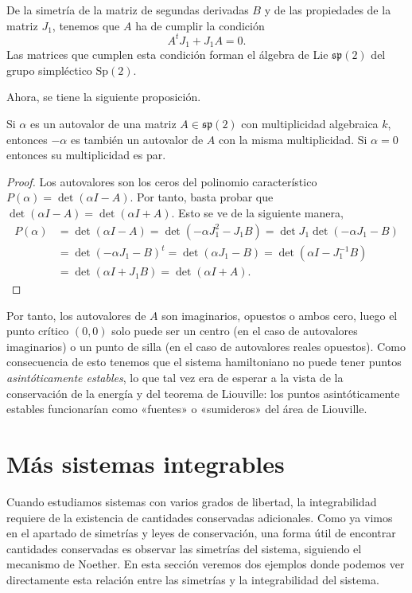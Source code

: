    De la simetría de la matriz de segundas derivadas $B$ y de las propiedades de la matriz $J_1$, tenemos que $A$ ha de cumplir la condición
   \begin{equation*}
     A^{t}J_1+J_1 A=0.
   \end{equation*}
   Las matrices que cumplen esta condición forman el álgebra de Lie $\mathfrak{sp}(2)$ del grupo simpléctico $\mathrm{Sp}(2)$.

   Ahora, se tiene la siguiente proposición.
   \begin{prop}
     Si $\alpha$ es un autovalor de una matriz $A\in \mathfrak{sp}(2)$ con multiplicidad algebraica $k$, entonces $-\alpha$ es también un autovalor de $A$ con la misma multiplicidad. Si $\alpha=0$ entonces su multiplicidad es par.
   \end{prop}
   \begin{proof}
     Los autovalores son los ceros del polinomio característico $P(\alpha)=\det(\alpha I-A)$. Por tanto, basta probar que $\det(\alpha I-A)=\det(\alpha I + A)$. Esto se ve de la siguiente manera,
     \begin{align*}
       P(\alpha)&=\det(\alpha I-A)=\det(-\alpha J_1^2-J_1B)=\det J_1\det(-\alpha J_1 - B)\\
       &=\det(-\alpha J_1-B)^t=\det (\alpha J_1 - B)=\det(\alpha I - J_1^{-1}B)\\
       &=\det(\alpha I + J_1 B)=\det(\alpha I +A).
     \end{align*}
   \end{proof}
   Por tanto, los autovalores de $A$ son imaginarios, opuestos o ambos cero, luego el punto crítico $(0,0)$ solo puede ser un centro (en el caso de autovalores imaginarios) o un punto de silla (en el caso de autovalores reales opuestos). Como consecuencia de esto tenemos que el sistema hamiltoniano no puede tener puntos \emph{asintóticamente estables}, lo que tal vez era de esperar a la vista de la conservación de la energía y del teorema de Liouville: los puntos asintóticamente estables funcionarían como «fuentes» o «sumideros» del área de Liouville.



   \section{Más sistemas integrables}
   Cuando estudiamos sistemas con varios grados de libertad, la integrabilidad requiere de la existencia de cantidades conservadas adicionales. Como ya vimos en el apartado de simetrías y leyes de conservación, una forma útil de encontrar cantidades conservadas es observar las simetrías del sistema, siguiendo el mecanismo de Noether. En esta sección veremos dos ejemplos donde podemos ver directamente esta relación entre las simetrías y la integrabilidad del sistema.

